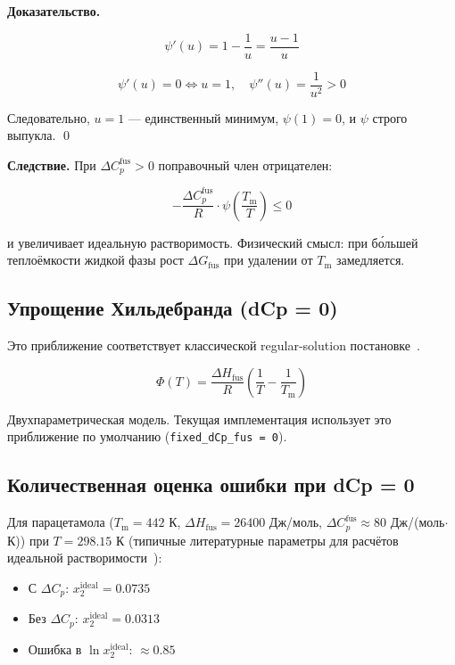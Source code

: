 \documentclass[11pt]{article}
\begin{document}
\textbf{Доказательство.}

\begin{equation*}
\psi'(u) = 1 - \frac{1}{u} = \frac{u - 1}{u}
\end{equation*}

\begin{equation*}
\psi'(u) = 0 \iff u = 1, \quad \psi''(u) = \frac{1}{u^2} > 0
\end{equation*}

Следовательно, $u = 1$ --- единственный минимум, $\psi(1) = 0$, и $\psi$ строго выпукла. \qed

\textbf{Следствие.} При $\Delta C_p^{\mathrm{fus}} > 0$ поправочный член отрицателен:

\begin{equation*}
-\frac{\Delta C_p^{\mathrm{fus}}}{R} \cdot \psi\!\left(\frac{T_{\mathrm{m}}}{T}\right) \leq 0
\end{equation*}

и увеличивает идеальную растворимость. Физический смысл: при бо́льшей теплоёмкости жидкой фазы рост $\Delta G_{\mathrm{fus}}$ при удалении от $T_{\mathrm{m}}$ замедляется.

\subsection{Упрощение Хильдебранда (dCp = 0)}

Это приближение соответствует классической regular-solution постановке~\cite{hildebrand1970}.

\begin{equation*}
\Phi(T) = \frac{\Delta H_{\mathrm{fus}}}{R}\!\left(\frac{1}{T} - \frac{1}{T_{\mathrm{m}}}\right)
\end{equation*}

Двухпараметрическая модель. Текущая имплементация использует это приближение по умолчанию (\texttt{fixed\_dCp\_fus = 0}).

\subsection{Количественная оценка ошибки при dCp = 0}

Для парацетамола ($T_{\mathrm{m}} = 442$ К, $\Delta H_{\mathrm{fus}} = 26400$ Дж/моль, $\Delta C_p^{\mathrm{fus}} \approx 80$ Дж/(моль$\cdot$К)) при $T = 298.15$ К (типичные литературные параметры для расчётов идеальной растворимости~\cite{yalkowsky1979,acree2010}):

\begin{itemize}
  \item С $\Delta C_p$: $x_2^{\mathrm{ideal}} = 0.0735$
  \item Без $\Delta C_p$: $x_2^{\mathrm{ideal}} = 0.0313$
  \item Ошибка в $\ln x_2^{\mathrm{ideal}}$: $\approx 0.85$
\end{itemize}
\end{document}
